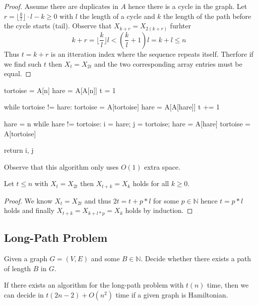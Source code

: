 \begin{proof}
	Assume there are duplicates in $A$ hence there is a cycle in the graph. Let $r = \lfloor \frac{k}{l} \rfloor \cdot l - k \geq 0$ with $l$ the length of a cycle and $k$ the length of the path before the cycle starts (tail). Observe that $X_{k+r} = X_{2(k+r)}$ furhter
	$$k + r = \lfloor \frac{k}{l} \rfloor l \lt (\frac{k}{l}+1)l = k+l \leq n$$
	Thus $t=k+r$ is an itteration index where the sequence repeats itself. Therfore if we find such $t$ then $X_t = X_{2t}$ and the two corresponding array entries must be equal.
\end{proof}

\begin{algorithm}
	tortoise = A[n]
	hare = A[A[n]]
	t = 1

	while tortoise != hare:
	tortoise = A[tortoise]
	hare = A[A[hare]]
	t += 1

	hare = n
	while hare != tortoise:
	i = hare;
	j = tortoise;
	hare = A[hare]
	tortoise = A[tortoise]

	return i, j
\end{algorithm}

\begin{remark}
	Observe that this algorithm only uses $O(1)$ extra space.
\end{remark}

\begin{lemma}
	Let $t\leq n$ with $X_t = X_{2t}$ then $X_{t+k} = X_{k}$ holds for all $k \geq 0$.
\end{lemma}

\begin{proof}
	We know $X_t = X_{2t}$ and thus $2t = t+p*l$ for some $p \in \mathbb{N}$ hence $t=p*l$ holds and finally $X_{t+k} = X_{k+l*p} = X_{k}$ holds by induction.
\end{proof}

\subsection{Long-Path Problem}

\begin{definition}
	Given a graph $G = (V,E)$ and some $B \in \mathbb{N}$. Decide whether there exists a path of length $B$ in $G$.
\end{definition}

\begin{theorem}
	If there exists an algorithm for the long-path problem with $t(n)$ time, then we can decide in $t(2n -2) + O(n^2)$ time if a given graph is Hamiltonian.
\end{theorem}

